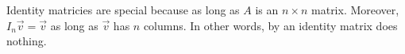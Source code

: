 \documentclass[../main.tex]{subfiles}
\begin{document}
Identity matricies are special because  as long as \(A\) is an \(n \times n\) matrix. Moreover, \(I_{n} \vec{v} = \vec{v}\) as long as \(\vec{v}\) has \(n\) columns. In other words,  by an identity matrix does nothing.  
\end{document}
